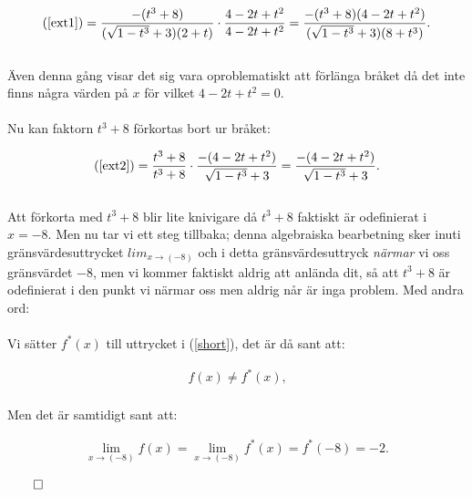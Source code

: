 \documentclass{article}
\begin{document}
\begin{gather}
  \text{(\ref{ext1})} = \frac{-( t^{3} + 8)}{(\sqrt{1 - t^{3}} + 3)(2 + t)} \cdot \frac{4 -2t + t^{2}}{4 -2t + t^{2}} =
  \frac{-( t^{3} + 8)(4 -2t + t^{2})}{(\sqrt{1 - t^{3}} + 3)(8 + t^{3})}\text{.} \label{ext2}
\end{gather}
\\
Även denna gång visar det sig vara oproblematiskt att förlänga bråket då det inte finns några värden på $x$ för vilket $4 - 2t + t^{2} = 0$.
\\
\\
Nu kan faktorn $t^{3} + 8$ förkortas bort ur bråket:

\begin{gather}
  \text{(\ref{ext2})} = \frac{t^{3} + 8}{t^{3} + 8} \cdot \frac{-(4 - 2t + t^{2})}{\sqrt{1 - t^{3}} + 3} =
  \frac{-(4 - 2t + t^{2})}{\sqrt{1 - t^{3}} + 3}\text{.}
  \label{short}
\end{gather}
\\
Att förkorta med $t^{3} + 8$ blir lite knivigare då $t^{3} + 8$ faktiskt är odefinierat i $x = -8$. Men nu tar vi ett steg tillbaka; denna algebraiska bearbetning sker inuti gränsvärdesuttrycket $lim_{x \to (-8)}$ och i detta gränsvärdesuttryck \emph{närmar} vi oss gränsvärdet $-8$, men vi kommer faktiskt aldrig att anlända dit, så att $t^{3} + 8$ är odefinierat i den punkt vi närmar oss men aldrig når är inga problem. Med andra ord:
\\
\\
Vi sätter $f^{\ast}(x)$ till uttrycket i (\ref{short}), det är då sant att:

\begin{gather*}
  f(x) \neq f^{\ast}(x) \text{,}
\end{gather*}
\\
Men det är samtidigt sant att:

\begin{gather*}
  \lim_{x \to (-8)} f(x) =
  \lim_{x \to (-8)} f^{\ast}(x) =
  f^{\ast}(-8) = -2\text{.}
\end{gather*}

\centerline{$\qed$}
\end{document}
